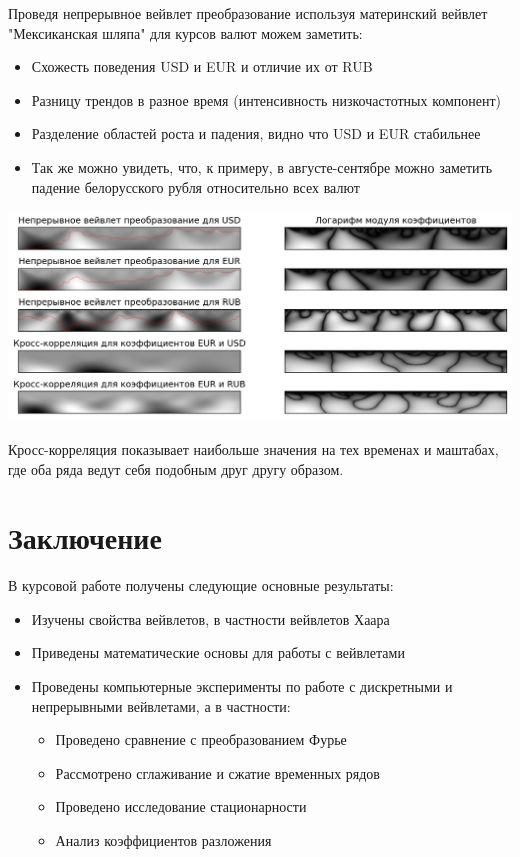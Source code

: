 \documentclass[a4paper]{article}
\newcommand{\anonsection}[1]{ \section*{#1} \addcontentsline{toc}{section}{\numberline {}#1}}
\begin{document}
	Проведя непрерывное вейвлет преобразование используя материнский вейвлет "Мексиканская шляпа" для курсов валют можем заметить:
	\begin{itemize}
		\item Схожесть поведения USD и EUR и отличие их от RUB
		\item Разницу трендов в разное время (интенсивность низкочастотных компонент)
		\item Разделение областей роста и падения, видно что USD и EUR стабильнее
		\item Так же можно увидеть, что, к примеру, в августе-сентябре можно заметить падение белорусского рубля относительно всех валют
	\end{itemize}

	\begin{center}
		\includegraphics[scale=0.4]{./output_7_1.png}
	\end{center}

	Кросс-корреляция показывает наибольше значения на тех временах и маштабах, где оба ряда ведут себя подобным друг другу образом.
	
	
	\anonsection{Заключение}
	
	В курсовой работе получены следующие основные результаты:
	
	\begin{itemize}
		\item Изучены свойства вейвлетов, в частности вейвлетов Хаара
		\item Приведены математические основы для работы с вейвлетами
		\item Проведены компьютерные эксперименты по работе с дискретными и непрерывными вейвлетами, а в частности:
		\begin{itemize}
			\item Проведено сравнение с преобразованием Фурье
			\item Рассмотрено сглаживание и сжатие временных рядов
			\item Проведено исследование стационарности
			\item Анализ коэффициентов разложения
		\end{itemize}
	\end{itemize}
	
\end{document}
